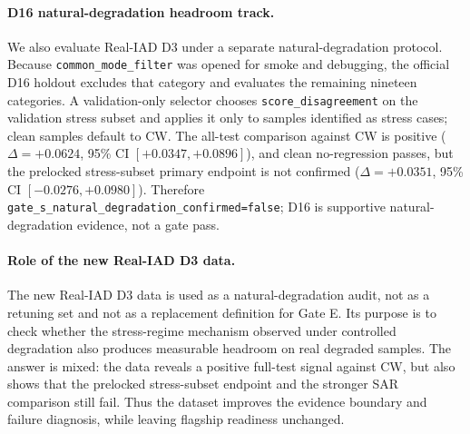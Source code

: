 \documentclass[10pt,conference]{IEEEtran}
\begin{document}
\paragraph{D16 natural-degradation headroom track.}
We also evaluate Real-IAD D3 under a separate natural-degradation protocol.
Because \texttt{common\_mode\_filter} was opened for smoke and debugging, the
official D16 holdout excludes that category and evaluates the remaining
nineteen categories. A validation-only selector chooses
\texttt{score\_disagreement} on the validation stress subset and applies it
only to samples identified as stress cases; clean samples default to CW. The
all-test comparison against CW is positive ($\Delta=+0.0624$, 95\% CI
$[+0.0347,+0.0896]$), and clean no-regression passes, but the prelocked
stress-subset primary endpoint is not confirmed ($\Delta=+0.0351$, 95\% CI
$[-0.0276,+0.0980]$). Therefore
\texttt{gate\_s\_natural\_degradation\_confirmed=false}; D16 is supportive
natural-degradation evidence, not a gate pass.

\paragraph{Role of the new Real-IAD D3 data.}
The new Real-IAD D3 data is used as a natural-degradation audit, not as a
retuning set and not as a replacement definition for Gate E. Its purpose is to
check whether the stress-regime mechanism observed under controlled
degradation also produces measurable headroom on real degraded samples. The
answer is mixed: the data reveals a positive full-test signal against CW, but
also shows that the prelocked stress-subset endpoint and the stronger SAR
comparison still fail. Thus the dataset improves the evidence boundary and
failure diagnosis, while leaving flagship readiness unchanged.

\begin{table}[t]
\centering
\caption{D16 Real-IAD D3 natural-degradation audit. The primary endpoint is
the stress subset versus confidence-weighted mean (CW); all-test rows are
supportive only.}
\label{tab:natural-degradation-d16}
\footnotesize
{}
\end{table}

\begin{table}[t]
\centering
\caption{Stress-regime transfer on held-out external 3D-ADAM: depth
degraded by $\alpha$. RGA's KS-drift gate significantly beats
confidence-weighting (CW) once a modality degrades ($\alpha\ge0.5$),
while ties on clean data.}
\label{tab:degradation-transfer-v3}
\end{table}
\end{document}
